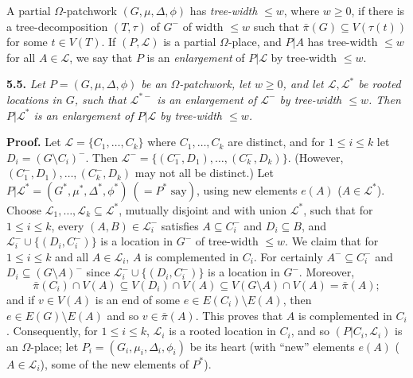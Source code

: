 A partial $\Omega$-patchwork $(G, \mu, \Delta, \phi)$ has \textit{tree-width} $\le w$, where $w \ge 0$, if there is a tree-decomposition $(T, \tau)$ of $G^-$ of width $\le w$ such that $\bar{\pi}(G) \subseteq V(\tau(t))$ for some $t \in V(T)$. If $(P, \mathscr{L})$ is a partial $\Omega$-place, and $P|A$ has tree-width $\le w$ for all $A \in \mathscr{L}$, we say that $P$ is an \textit{enlargement} of $P|\mathscr{L}$ by tree-width $\le w$.

\textbf{5.5.} \textit{Let $P = (G, \mu, \Delta, \phi)$ be an $\Omega$-patchwork, let $w \ge 0$, and let $\mathscr{L}, \mathscr{L}^*$ be rooted locations in $G$, such that $\mathscr{L}^{*-}$ is an enlargement of $\mathscr{L}^-$ by tree-width $\le w$. Then $P | \mathscr{L}^*$ is an enlargement of $P | \mathscr{L}$ by tree-width $\le w$.}

\textbf{Proof.} Let $\mathscr{L} = \{C_1, \dots, C_k\}$ where $C_1, \dots, C_k$ are distinct, and for $1 \le i \le k$ let $D_i = (G \setminus C_i)^-$. Then $\mathscr{L}^- = \{(C_1^-, D_1), \dots, (C_k^-, D_k)\}$. (However, $(C_1^-, D_1), \dots, (C_k^-, D_k)$ may not all be distinct.) Let $P | \mathscr{L}^* = (G^*, \mu^*, \Delta^*, \phi^*) \ (= P^* \text{ say})$, using new elements $e(A)$ ($A \in \mathscr{L}^*$). Choose $\mathscr{L}_1, \dots, \mathscr{L}_k \subseteq \mathscr{L}^*$, mutually disjoint and with union $\mathscr{L}^*$, such that for $1 \le i \le k$, every $(A, B) \in \mathscr{L}_i^-$ satisfies $A \subseteq C_i^-$ and $D_i \subseteq B$, and $\mathscr{L}_i^- \cup \{(D_i, C_i^-)\}$ is a location in $G^-$ of tree-width $\le w$. We claim that for $1 \le i \le k$ and all $A \in \mathscr{L}_i$, $A$ is complemented in $C_i$. For certainly $A^- \subseteq C_i^-$ and $D_i \subseteq (G \setminus A)^-$ since $\mathscr{L}_i^- \cup \{(D_i, C_i^-)\}$ is a location in $G^-$. Moreover,
\begin{equation*}
\bar{\pi}(C_i) \cap V(A) \subseteq V(D_i) \cap V(A) \subseteq V(G \setminus A) \cap V(A) = \bar{\pi}(A);
\end{equation*}
and if $v \in V(A)$ is an end of some $e \in E(C_i) \setminus E(A)$, then $e \in E(G) \setminus E(A)$ and so $v \in \bar{\pi}(A)$. This proves that $A$ is complemented in $C_i$. Consequently, for $1 \le i \le k$, $\mathscr{L}_i$ is a rooted location in $C_i$, and so $(P | C_i, \mathscr{L}_i)$ is an $\Omega$-place; let $P_i = (G_i, \mu_i, \Delta_i, \phi_i)$ be its heart (with ``new'' elements $e(A)$ ($A \in \mathscr{L}_i$), some of the new elements of $P^*$).

